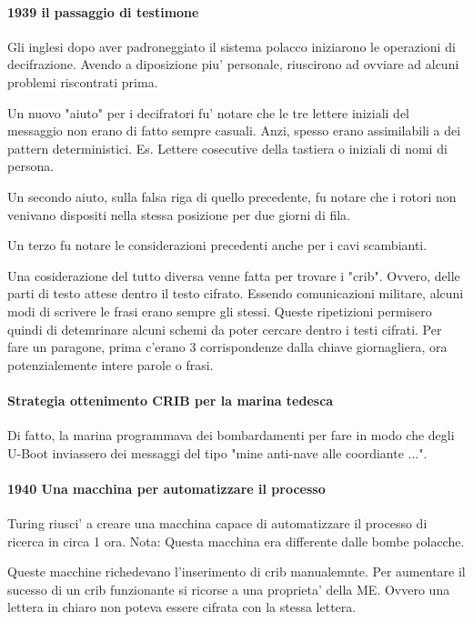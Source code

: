 \paragraph{1939 il passaggio di testimone}
Gli inglesi dopo aver padroneggiato il sistema polacco iniziarono le operazioni di decifrazione.
Avendo a diposizione piu' personale, riuscirono ad ovviare ad alcuni problemi riscontrati prima.

Un nuovo "aiuto" per i decifratori fu' notare che le tre lettere iniziali del messaggio
non erano di fatto sempre casuali.
Anzi, spesso erano assimilabili a dei pattern deterministici.
Es. Lettere cosecutive della tastiera o iniziali di nomi di persona.

Un secondo aiuto, sulla falsa riga di quello precedente, fu notare che i rotori non venivano
dispositi nella stessa posizione per due giorni di fila.

Un terzo fu notare le considerazioni precedenti anche per i cavi scambianti.

Una cosiderazione del tutto diversa venne fatta per trovare i "crib".
Ovvero, delle parti di testo attese dentro il testo cifrato.
Essendo comunicazioni militare, alcuni modi di scrivere le frasi erano sempre gli stessi.
Queste ripetizioni permisero quindi di detemrinare alcuni schemi da poter cercare dentro
i testi cifrati.
Per fare un paragone, prima c'erano 3 corrispondenze dalla chiave giornagliera, ora potenzialemente
intere parole o frasi.

\paragraph{Strategia ottenimento CRIB per la marina tedesca}
Di fatto, la marina programmava dei bombardamenti per fare in modo che
degli U-Boot inviassero dei messaggi del tipo "mine anti-nave alle coordiante ...".

\paragraph{1940 Una macchina per automatizzare il processo}
Turing riusci' a creare una macchina capace di automatizzare il processo di ricerca in circa 1 ora.
Nota: Questa macchina era differente dalle bombe polacche.

Queste macchine richedevano l'inserimento di crib manualemnte.
Per aumentare il sucesso di un crib funzionante si ricorse a una proprieta'
della ME.
Ovvero una lettera in chiaro non poteva essere cifrata con la stessa lettera.

